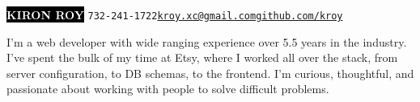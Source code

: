 \documentclass[9pt]{developercv} %
\begin{document}

\begin{minipage}[t]{1\textwidth} %
    \vspace{-\baselineskip} %
    
    \colorbox{black}{{\HUGE\textcolor{white}{\textbf{\MakeUppercase{Kiron Roy}}}}} \hspace{.3 cm} \large\texttt{732-241-1722\slashsep\href{mailto:kroy.xc@gmail.com}{kroy.xc@gmail.com}\slashsep\href{https://github.com/kroy}{github.com/kroy}}
    
    \vspace{6pt}
    
\end{minipage}

\vspace{0.5cm}



\begin{minipage}[t]{0.4\textwidth} %
    \vspace{-\baselineskip} %
    
    I'm a web developer with wide ranging experience over 5.5 years in the industry. I've spent the bulk of my time at Etsy, where I worked all over the stack, from server configuration, to DB schemas, to the frontend. I'm curious, thoughtful, and passionate about working with people to solve difficult problems.
\end{minipage}
\hfill %
\begin{minipage}[t]{0.5\textwidth} %
    \vspace{-\baselineskip} %
    \\
    \\
    \\
\end{minipage}
\end{document}
